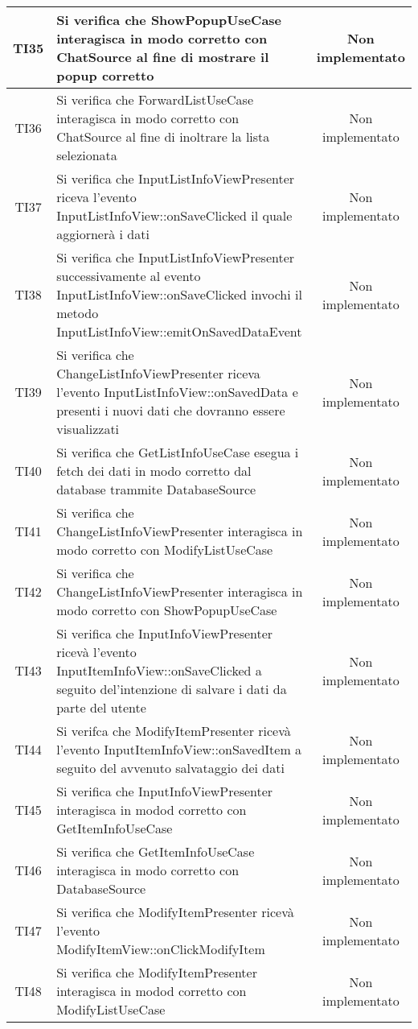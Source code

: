 \begin{center}
\begin{longtable}{|c|>{\centering}m{10cm}|c|}
		TI35 & Si verifica che ShowPopupUseCase interagisca in modo corretto con ChatSource al fine di mostrare il popup corretto & Non implementato \\ \hline
		TI36 & Si verifica che ForwardListUseCase interagisca in modo corretto con ChatSource al fine di inoltrare la lista selezionata & Non implementato \\ \hline
		TI37 & Si verifica che InputListInfoViewPresenter riceva l'evento InputListInfoView::onSaveClicked il quale aggiornerà i dati & Non implementato \\ \hline
		TI38 & Si verifica che InputListInfoViewPresenter successivamente al evento InputListInfoView::onSaveClicked invochi il metodo InputListInfoView::emitOnSavedDataEvent & Non implementato \\ \hline
		TI39 & Si verifica che ChangeListInfoViewPresenter riceva l'evento InputListInfoView::onSavedData e presenti i nuovi dati che dovranno essere visualizzati & Non implementato \\ \hline
		TI40 & Si verifica che GetListInfoUseCase esegua i fetch dei dati in modo corretto dal database trammite DatabaseSource & Non implementato \\ \hline
		TI41 & Si verifica che ChangeListInfoViewPresenter interagisca in modo corretto con ModifyListUseCase & Non implementato \\ \hline
		TI42 & Si verifica che ChangeListInfoViewPresenter interagisca in modo corretto con ShowPopupUseCase & Non implementato \\ \hline
		TI43 & Si verifica che InputInfoViewPresenter ricevà l'evento InputItemInfoView::onSaveClicked a seguito del'intenzione di salvare i dati da parte del utente & Non implementato \\ \hline
		TI44 & Si verifca che ModifyItemPresenter ricevà l'evento InputItemInfoView::onSavedItem a seguito del avvenuto salvataggio dei dati & Non implementato \\ \hline
		TI45 & Si verifica che InputInfoViewPresenter interagisca in modod corretto con GetItemInfoUseCase & Non implementato \\ \hline
		TI46 & Si verifica che GetItemInfoUseCase interagisca in modo corretto con DatabaseSource & Non implementato \\ \hline
		TI47 & Si verifica che ModifyItemPresenter ricevà l'evento ModifyItemView::onClickModifyItem & Non implementato \\ \hline
		TI48 & Si verifica che ModifyItemPresenter interagisca in modod corretto con ModifyListUseCase & Non implementato \\ \hline

\end{longtable}
\end{center}
